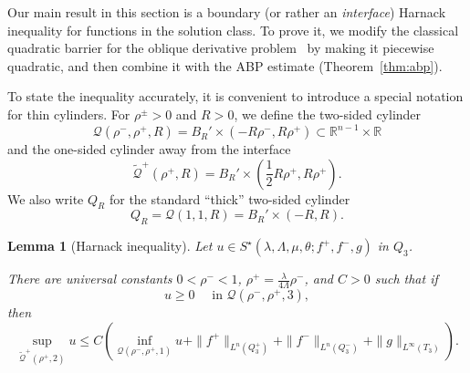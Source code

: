 \documentclass[letter,11pt]{amsart}
\newcommand{\R}{\mathbb{R}}
\newcommand{\gcal}{\mathcal{Q}}
\newtheorem{lem}[thm]{Lemma}
\theoremstyle{definition}
\numberwithin{equation}{section}
\begin{document}
Our main result in this section is a boundary (or rather an \emph{interface}) Harnack inequality for functions in the solution class.
To prove it, we modify the classical quadratic barrier for the oblique derivative problem~\cite{LT} by making it piecewise quadratic, and then combine it with the ABP estimate (Theorem~\ref{thm:abp}).

\medskip

To state the inequality accurately, it is convenient to introduce a special notation for thin cylinders.
For $\rho^{\pm} > 0$ and $R > 0$, we define the two-sided cylinder
\[
\gcal(\rho^{-}, \rho^{+}, R) = B_R' \times (- R \rho^{-}, R \rho^{+}) \subset \R^{n-1} \times \R
\]
and the one-sided cylinder away from the interface
\[
\widetilde{\gcal}^{+}(\rho^{+}, R) 
= B_R' \times \textstyle (\frac{1}{2}R \rho^{+}, R \rho^{+}).
\]
We also write $Q_R$ for the standard ``thick'' two-sided cylinder
\[
Q_R = \gcal(1,1, R) = B_R' \times(-R,R).
\]

\medskip

\begin{lem}[Harnack inequality]
\label{lem:harnack}
Let $u \in S^{\star}(\lambda, \Lambda,\mu,\theta; f^{+}, f^{-},g)$ in $Q_3$.

There are universal constants 
$0 < \rho^{-} < 1$, $\rho^{+} = \frac{\lambda}{4\Lambda} \rho^{-}$, 
and $C > 0$ such that if
\[
u \geq 0 \quad \text{ in } \gcal(\rho^{-}, \rho^{+}, 3),
\]
then
\[
\sup_{\widetilde{\gcal}^{+}(\rho^{+}, 2)} u \leq C \left( \inf_{\gcal(\rho^{-}, \rho^{+}, 1)} u
+\|f^{+}\|_{L^{n}(Q_3^{+})} + \|f^{-}\|_{L^{n}(Q_3^{-})}+ \|g\|_{L^{\infty}(T_3)}
\right).
\]
\end{lem}
\end{document}
